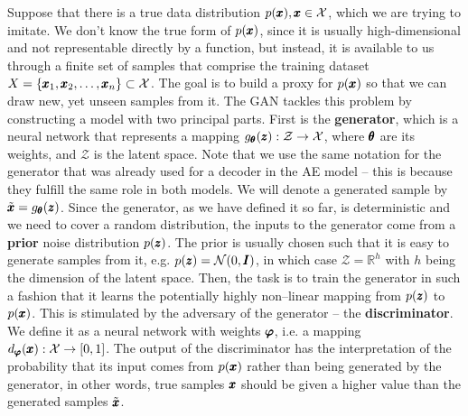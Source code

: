 Suppose that there is a true data distribution $p(\pmb{{x}}),\pmb{{x}}\in\mathcal{X}$, which we are trying to imitate. We don't know the true form of $p(\pmb{{x}})$, since it is usually high-dimensional and not representable directly by a function, but instead, it is available to us through a finite set of samples that comprise the training dataset $X = \lbrace \pmb{{x}}_1, \pmb{{x}}_2, \ldots, \pmb{{x}}_n \rbrace \subset \mathcal{X}$. The goal is to build a proxy for $p(\pmb{{x}})$ so that we can draw new, yet unseen samples from it. The GAN tackles this problem by constructing a model with two principal parts. First is the \textbf{generator}, which is a neural network that represents a mapping $g_{\pmb{{\theta}}}(\pmb{{z}}):\mathcal{Z}\rightarrow\mathcal{X}$, where $\pmb{{\theta}}$ are its weights, and $\mathcal{Z}$ is the latent space. Note that we use the same notation for the generator that was already used for a decoder in the AE model -- this is because they fulfill the same role in both models. We will denote a generated sample by $\tilde{\pmb{{x}}} = g_{\pmb{{\theta}}}(\pmb{{z}})$. Since the generator, as we have defined it so far, is deterministic and we need to cover a random distribution, the inputs to the generator come from a \textbf{prior} noise distribution $p(\pmb{{z}})$. The prior is usually chosen such that it is easy to generate samples from it, e.g. $p(\pmb{{z}}) = \mathcal{N}(0,\pmb{{I}})$, in which case $\mathcal{Z} = \mathbb{R}^h$ with $h$ being the dimension of the latent space. Then, the task is to train the generator in such a fashion that it learns the potentially highly non--linear mapping from $p(\pmb{{z}})$ to $p(\pmb{{x}})$. This is stimulated by the adversary of the generator -- the \textbf{discriminator}. We define it as a neural network with weights $\pmb{{\varphi}}$, i.e. a mapping $d_{\vc{\varphi}}(\vc{x}):\mathcal{X}\rightarrow\left[0,1\right]$. The output of the discriminator has the interpretation of the probability that its input comes from $p(\pmb{{x}})$ rather than being generated by the generator, in other words, true samples $\pmb{{x}}$ should be given a higher value than the generated samples $\tilde{\pmb{{x}}}$.


